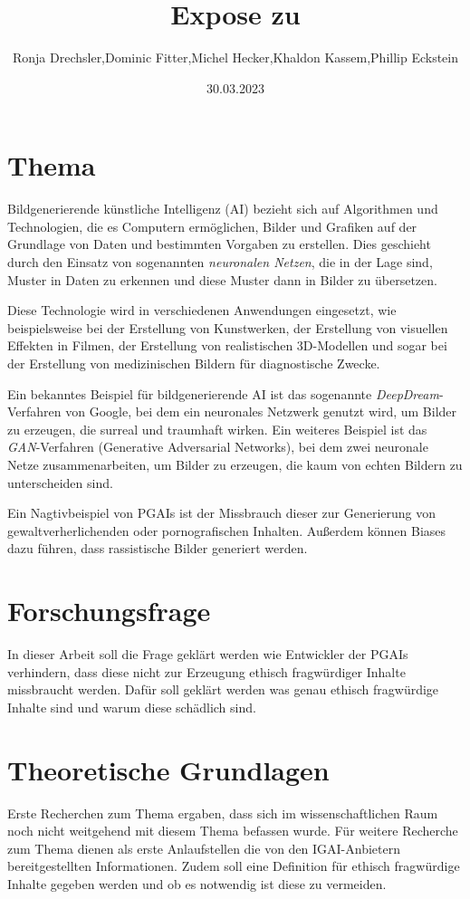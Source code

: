 \documentclass[12pt]{article}
\title{Expose zu}
\date{30.03.2023}
\author{Ronja Drechsler,Dominic Fitter,Michel Hecker,Khaldon Kassem,Phillip Eckstein}
\begin{document}
\maketitle

\section{Thema}
Bildgenerierende künstliche Intelligenz (AI) bezieht sich auf Algorithmen und Technologien, die es Computern ermöglichen, Bilder und Grafiken auf der Grundlage von Daten und bestimmten Vorgaben zu erstellen. Dies geschieht durch den Einsatz von sogenannten \emph{neuronalen Netzen}, die in der Lage sind, Muster in Daten zu erkennen und diese Muster dann in Bilder zu übersetzen.

Diese Technologie wird in verschiedenen Anwendungen eingesetzt, wie beispielsweise bei der Erstellung von Kunstwerken, der Erstellung von visuellen Effekten in Filmen, der Erstellung von realistischen 3D-Modellen und sogar bei der Erstellung von medizinischen Bildern für diagnostische Zwecke.

Ein bekanntes Beispiel für bildgenerierende AI ist das sogenannte \emph{DeepDream}-Verfahren von Google, bei dem ein neuronales Netzwerk genutzt wird, um Bilder zu erzeugen, die surreal und traumhaft wirken. Ein weiteres Beispiel ist das \emph{GAN}-Verfahren (Generative Adversarial Networks), bei dem zwei neuronale Netze zusammenarbeiten, um Bilder zu erzeugen, die kaum von echten Bildern zu unterscheiden sind.

Ein Nagtivbeispiel von PGAIs ist der Missbrauch dieser zur Generierung von gewaltverherlichenden oder pornografischen Inhalten. Außerdem können Biases dazu führen, dass rassistische Bilder generiert werden. 
\section{Forschungsfrage}
In dieser Arbeit soll die Frage geklärt werden wie Entwickler der PGAIs verhindern, dass diese nicht zur Erzeugung ethisch fragwürdiger Inhalte missbraucht werden. Dafür soll geklärt werden was genau ethisch fragwürdige Inhalte sind und warum diese schädlich sind.
\section{Theoretische Grundlagen}
Erste Recherchen zum Thema ergaben, dass sich im wissenschaftlichen Raum noch nicht weitgehend mit diesem Thema befassen wurde. Für weitere Recherche zum Thema dienen als erste Anlaufstellen die von den IGAI-Anbietern bereitgestellten Informationen.
Zudem soll eine Definition für ethisch fragwürdige Inhalte gegeben werden und ob es notwendig ist diese zu vermeiden.
\end{document}
